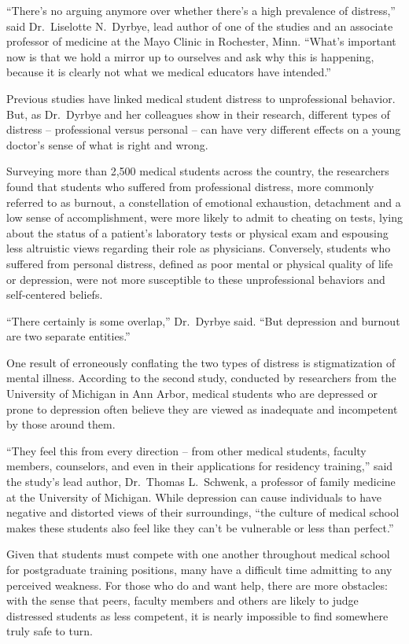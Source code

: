 ﻿\documentclass[12pt]{article}
\begin{document}
``There's no arguing anymore over whether there's a high prevalence of distress,'' said
Dr.~Liselotte N.~Dyrbye, lead author of one of the studies and an associate professor of medicine at
the Mayo Clinic in Rochester, Minn. ``What's important now is that we hold a mirror up to ourselves
and ask why this is happening, because it is clearly not what we medical educators have intended.''

Previous studies have linked medical student distress to unprofessional behavior. But, as Dr.~Dyrbye
and her colleagues show in their research, different types of distress -- professional versus
personal -- can have very different effects on a young doctor's sense of what is right and wrong.

Surveying more than 2,500 medical students across the country, the researchers found that students
who suffered from professional distress, more commonly referred to as burnout, a constellation of
emotional exhaustion, detachment and a low sense of accomplishment, were more likely to admit to
cheating on tests, lying about the status of a patient's laboratory tests or physical exam and
espousing less altruistic views regarding their role as physicians. Conversely, students who
suffered from personal distress, defined as poor mental or physical quality of life or depression,
were not more susceptible to these unprofessional behaviors and self-centered beliefs.

``There certainly is some overlap,'' Dr.~Dyrbye said. ``But depression and burnout are two separate
entities.''

One result of erroneously conflating the two types of distress is stigmatization of mental illness.
According to the second study, conducted by researchers from the University of Michigan in Ann
Arbor, medical students who are depressed or prone to depression often believe they are viewed as
inadequate and incompetent by those around them.

``They feel this from every direction -- from other medical students, faculty members, counselors,
and even in their applications for residency training,'' said the study's lead author, Dr.~Thomas
L.~Schwenk, a professor of family medicine at the University of Michigan. While depression can cause
individuals to have negative and distorted views of their surroundings, ``the culture of medical
school makes these students also feel like they can't be vulnerable or less than perfect.''

Given that students must compete with one another throughout medical school for postgraduate
training positions, many have a difficult time admitting to any perceived weakness. For those who do
and want help, there are more obstacles: with the sense that peers, faculty members and others are
likely to judge distressed students as less competent, it is nearly impossible to find somewhere
truly safe to turn.
\end{document}
